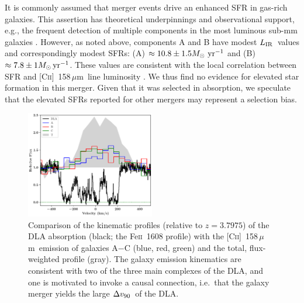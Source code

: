 \documentclass[twocolumn]{aastex62}
\newcommand{\zdla}{3.7975}
\newcommand{\cplus}{[\ctwo]~158\,$\mu$m}
\newcommand{\mdvninety}{\Delta v_{\rm 90}}
\newcommand{\dvninety}{$\mdvninety$}
\newcommand{\mldust}{L_{\rm IR}}  %
\newcommand{\ldust}{$\mldust$}
\newcommand{\fetwo}{Fe\textsc{ii}}
\newcommand{\mmsun}{M_{\odot}}
\newcommand{\msun}{$\mmsun$}
\newcommand{\ctwo}{C\textsc{ii}}
\begin{document}
It is commonly assumed that merger events drive an enhanced SFR  in gas-rich galaxies. 
This assertion has theoretical underpinnings \citep{mh96} and observational support, 
e.g., the frequent detection of multiple components in the most luminous sub-mm galaxies 
\citep{hayward+18}. However, as noted above, components A and B have modest \ldust\ 
values and correspondingly modest SFRs: (A) $\approx 10.8 \pm 1.5 \mmsun \, \, \rm yr^{-1}$ 
and (B) $\approx 7.8 \pm 1 \mmsun \, \rm yr^{-1}$. These values are consistent with 
the local correlation between SFR and \cplus\ line luminosity \citep[][]{delooze11,delooze14}. 
We thus find no evidence for elevated star formation in this merger. Given that it was 
selected in absorption, we speculate that the elevated SFRs reported for other mergers 
may represent a selection bias.


\begin{figure}
\centering
\includegraphics[width=0.5\textwidth]{fig_kinematics.pdf}
\vspace{-0.3in}
\caption{Comparison of the kinematic profiles (relative to $z=\zdla$) of the DLA absorption 
(black; the \fetwo~1608 profile) with the \cplus\ emission of galaxies A$-$C (blue, red, green) 
and the total, flux-weighted profile (gray). The galaxy emission kinematics are consistent 
with two of the three main complexes of the DLA, and one is motivated to invoke a causal 
connection, i.e.\ that the galaxy merger yields the large \dvninety\ of the DLA.
}
\label{fig:kinematics}
\end{figure}
\end{document}
